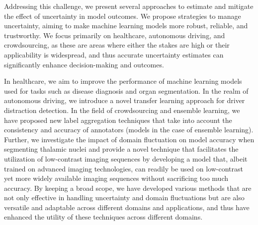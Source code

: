 Addressing this challenge, we present several approaches to estimate and mitigate the effect of uncertainty in model outcomes. We propose strategies to manage uncertainty, aiming to make machine learning models more robust, reliable, and trustworthy. We focus primarily on healthcare, autonomous driving, and crowdsourcing, as these are areas where either the stakes are high or their applicability is widespread, and thus accurate uncertainty estimates can significantly enhance decision-making and outcomes.

In healthcare, we aim to improve the performance of machine learning models used for tasks such as disease diagnosis and organ segmentation. In the realm of autonomous driving, we introduce a novel transfer learning approach for driver distraction detection. In the field of crowdsourcing and ensemble learning, we have proposed new label aggregation techniques that take into account the consistency and accuracy of annotators (models in the case of ensemble learning). Further, we investigate the impact of domain fluctuation on model accuracy when segmenting thalamic nuclei and provide a novel technique that facilitates the utilization of low-contrast imaging sequences by developing a model that, albeit trained on advanced imaging technologies,  can readily be used on low-contrast yet more widely available imaging sequences without sacrificing too much accuracy.
By keeping a broad scope, we  have developed various methods that are not only effective in handling uncertainty and domain fluctuations but are also versatile and adaptable across different domains and applications, and thus have enhanced the utility of these techniques across different domains.

